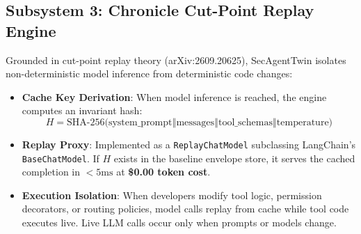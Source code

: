 \documentclass[10pt,a4paper]{article}
\begin{document}
\subsection{Subsystem 3: Chronicle Cut-Point Replay Engine}
Grounded in cut-point replay theory (arXiv:2609.20625), SecAgentTwin isolates non-deterministic model inference from deterministic code changes:
\begin{itemize}[leftmargin=1.5em,noitemsep]
    \item \textbf{Cache Key Derivation}: When model inference is reached, the engine computes an invariant hash:
    \begin{equation}
    H = \text{SHA-256}\Big(\text{system\_prompt} \mathbin{\Vert} \text{messages} \mathbin{\Vert} \text{tool\_schemas} \mathbin{\Vert} \text{temperature}\Big)
    \end{equation}
    \item \textbf{Replay Proxy}: Implemented as a \texttt{ReplayChatModel} subclassing LangChain's \texttt{BaseChatModel}. If $H$ exists in the baseline envelope store, it serves the cached completion in $<5\text{ms}$ at \textbf{\$0.00 token cost}.
    \item \textbf{Execution Isolation}: When developers modify tool logic, permission decorators, or routing policies, model calls replay from cache while tool code executes live. Live LLM calls occur only when prompts or models change.
\end{itemize}
\end{document}
